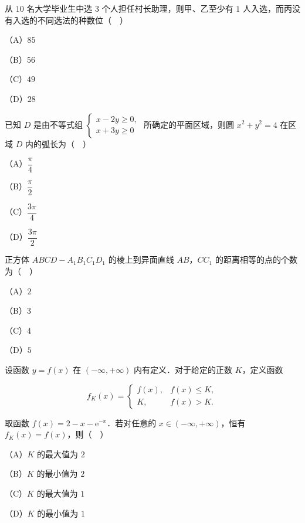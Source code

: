\endgroup
\begin{question}
从 $10$ 名大学毕业生中选 $3$ 个人担任村长助理，则甲、乙至少有 $1$ 人入选，而丙没有入选的不同选法的种数位（　）

（A）$85$

（B）$56$

（C）$49$

（D）$28$

\end{question}
\begin{question}
已知 $D$ 是由不等式组 $\begin{cases}x-2y\geqslant0,\\ x+3y\geqslant0\end{cases}$ 所确定的平面区域，则圆 $x^2+y^2=4$ 在区域 $D$ 内的弧长为（　）

（A）$\dfrac\pi4$

（B）$\dfrac\pi2$

（C）$\dfrac{3\pi}4$

（D）$\dfrac{3\pi}2$

\end{question}
\begin{question}
正方体 $ABCD-A_1B_1C_1D_1$ 的棱上到异面直线 $AB$，$CC_1$ 的距离相等的点的个数为（　）

（A）$2$

（B）$3$

（C）$4$

（D）$5$

\end{question}
\begin{question}
设函数 $y=f(x)$ 在 $(-\infty,+\infty)$ 内有定义．对于给定的正数 $K$，定义函数

\nopagebreak[4]
\[f_K(x)=\begin{cases}f(x),&f(x)\leqslant K,\\ K,&f(x)>K.\end{cases}\]

取函数 $f(x)=2-x-\mathrm e^{-x}$．若对任意的 $x\in(-\infty,+\infty)$，恒有 $f_K(x)=f(x)$，则（　）

（A）$K$ 的最大值为 $2$

（B）$K$ 的最小值为 $2$

（C）$K$ 的最大值为 $1$

（D）$K$ 的最小值为 $1$

\end{question}

